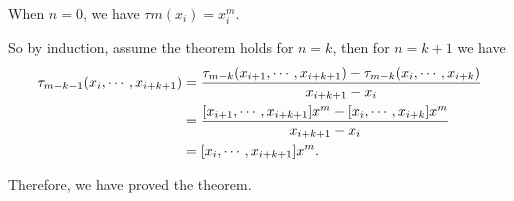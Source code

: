 \documentclass[a4paper]{article}
\begin{document}
When $n=0$, we have $\tau{m}(x_i) = x_i^m$. 

So by induction, assume the theorem holds for $n=k$, then for $n=k+1$ we have
\begin{equation}
    \begin{aligned}
        \tau_{m-k-1} \qty(x_i,\cdots,x_{i+k+1}) &= \frac{\tau_{m-k} (x_{i+1},\cdots,x_{i+k+1}) - \tau_{m-k}(x_{i}, \cdots, x_{i+k})}{x_{i+k+1} - x_i} \\
        &= \frac{[x_{i+1},\cdots, x_{i+k+1}]x^m - [x_{i}, \cdots, x_{i+k}]x^m}{x_{i+k+1} - x_i} \\
        &= [x_i,\cdots,x_{i+k+1}]x^m.
    \end{aligned}
\end{equation}

Therefore, we have proved the theorem.
\end{document}
